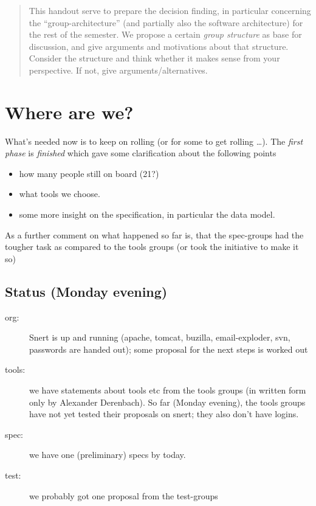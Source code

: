 \documentclass[11pt,handout]{handout}
\begin{document}
\thispagestyle{empty}





\begin{abstract}
  This handout serve to prepare the decision finding, in particular
  concerning the ``group-architecture'' (and partially also the software
  architecture) for the rest of the semester. We propose a certain
  \emph{group structure} as base for discussion, and give arguments and
  motivations about that structure.  Consider the structure and think
  whether it makes sense from your perspective. If not, give
  arguments/alternatives.
\end{abstract}

\section*{Where are we?}



What's needed now is to keep on rolling (or for some to get rolling
\ldots). The \emph{first phase} is \emph{finished} which gave some
clarification about the following points

\begin{itemize}
\item how many people still on board (21?)
\item what tools we choose.
\item some more insight on the specification, in particular the data model.
\end{itemize}

As a further comment on what happened so far is, that the spec-groups had
the tougher task as compared to the tools groups (or took the initiative to
make it so)


\subsection*{Status (Monday evening)}




\begin{description}
\item[org:] Snert is up and running (apache, tomcat, buzilla,
  email-exploder, svn, passwords are handed out); some proposal for the
  next steps is worked out
\item[tools:] we have statements about tools etc from the tools groups (in
  written form only by Alexander Derenbach). So far (Monday evening), the
  tools groups have not yet tested their proposals on snert; they also
  don't have logins.
\item[spec:] we have one (preliminary) specs by today.
\item[test:] we probably got one proposal from the test-groups
\end{description}
\end{document}
